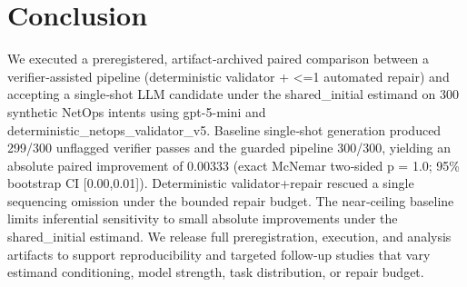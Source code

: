 \documentclass[conference]{IEEEtran}
\begin{document}
\section{Conclusion}
We executed a preregistered, artifact‑archived paired comparison between a verifier‑assisted pipeline (deterministic validator + <=1 automated repair) and accepting a single‑shot LLM candidate under the shared\_initial estimand on 300 synthetic NetOps intents using gpt-5-mini and deterministic\_netops\_validator\_v5. Baseline single‑shot generation produced 299/300 unflagged verifier passes and the guarded pipeline 300/300, yielding an absolute paired improvement of 0.00333 (exact McNemar two‑sided p = 1.0; 95\% bootstrap CI [0.00,0.01]). Deterministic validator+repair rescued a single sequencing omission under the bounded repair budget. The near‑ceiling baseline limits inferential sensitivity to small absolute improvements under the shared\_initial estimand. We release full preregistration, execution, and analysis artifacts to support reproducibility and targeted follow‑up studies that vary estimand conditioning, model strength, task distribution, or repair budget.
\end{document}
